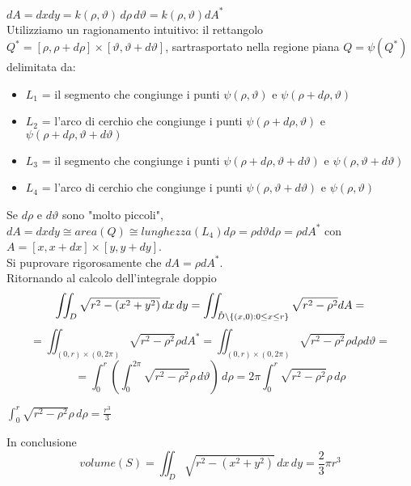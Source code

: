 \begin{itemize}
        $dA = dxdy = k (\rho, \vartheta)\, d\rho \, d\vartheta = k(\rho,\vartheta)dA^{*}$\\
        Utilizziamo un ragionamento intuitivo: il rettangolo 
        $Q^* = [\rho, \rho + d\rho]\times[\vartheta, \vartheta+d\vartheta]$, sar\aca trasportato nella
        regione piana $Q = \psi(Q^*)$ delimitata da:
        \begin{itemize}
          \item $L_1$ = il segmento che congiunge i punti $\psi(\rho, \vartheta)$ e $\psi(\rho + d\rho, \vartheta)$
          \item $L_2$ = l'arco di cerchio che congiunge i punti $\psi(\rho+d\rho, \vartheta)$ e $\psi(\rho + d\rho, \vartheta+d\vartheta)$
          \item $L_3$ = il segmento che congiunge i punti $\psi(\rho+d\rho, \vartheta+d\vartheta)$ e $\psi(\rho, \vartheta+d\vartheta)$
          \item $L_4$ = l'arco di cerchio che congiunge i punti $\psi(\rho, \vartheta+d\vartheta)$ e $\psi(\rho, \vartheta)$
        \end{itemize} 
        Se $d\rho$ e $d\vartheta$ sono "molto piccoli", 
        $dA = dx dy \cong area(Q) \cong lunghezza(L_4) d\rho = \rho d\vartheta d\rho = \rho dA^*$
        con $A = [x,x+dx]\times[y,y+dy]$. \\
        Si pu\aco provare rigorosamente che $dA = \rho dA^*$. \\
        Ritornando al calcolo dell'integrale doppio
        $$\iint_{D}\sqrt{r^2-(x^2+y^2)} \,dx \,dy = \iint_{\mathring{D}\setminus\{(x,0): 0 \leq x \leq r\}}
        \sqrt{r^2-\rho^2} dA =$$
        $$= \iint_{(0,r)\times(0,2\pi)} \sqrt{r^2-\rho^2} \rho dA^* = \iint_{(0,r)\times(0,2\pi)}
        \sqrt{r^2-\rho^2} \rho d\rho d\vartheta = $$
        $$= \int_{0}^{r}\left(\int_{0}^{2\pi} \sqrt{r^2-\rho^2} \rho \, d\vartheta\right)\, d\rho = 
        2\pi \int_{0}^{r} \sqrt{r^2-\rho^2} \rho \,d\rho$$
        \begin{exercise}
          $\int_{0}^{r} \sqrt{r^2-\rho^2} \rho \,d\rho = \frac{r^3}{3}$
        \end{exercise}
        In conclusione 
        $$volume(S) = \iint_{D} \sqrt{r^2-(x^2+y^2)} \,dx \, dy = \frac{2}{3}\pi r^3 $$
      \end{itemize}

